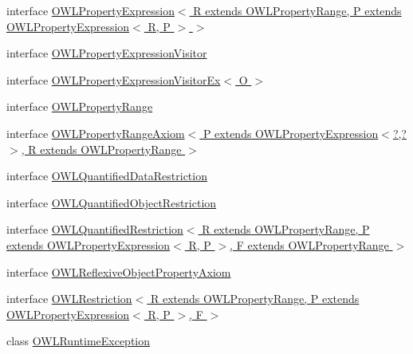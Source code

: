 \begin{DoxyCompactItemize}
\item 
interface \hyperlink{interfaceorg_1_1semanticweb_1_1owlapi_1_1model_1_1_o_w_l_property_expression_3_01_r_01extends_0189559738b26c5864733719a0227d2300}{O\-W\-L\-Property\-Expression$<$ R extends O\-W\-L\-Property\-Range, P extends O\-W\-L\-Property\-Expression$<$ R, P $>$ $>$}
\item 
interface \hyperlink{interfaceorg_1_1semanticweb_1_1owlapi_1_1model_1_1_o_w_l_property_expression_visitor}{O\-W\-L\-Property\-Expression\-Visitor}
\item 
interface \hyperlink{interfaceorg_1_1semanticweb_1_1owlapi_1_1model_1_1_o_w_l_property_expression_visitor_ex_3_01_o_01_4}{O\-W\-L\-Property\-Expression\-Visitor\-Ex$<$ O $>$}
\item 
interface \hyperlink{interfaceorg_1_1semanticweb_1_1owlapi_1_1model_1_1_o_w_l_property_range}{O\-W\-L\-Property\-Range}
\item 
interface \hyperlink{interfaceorg_1_1semanticweb_1_1owlapi_1_1model_1_1_o_w_l_property_range_axiom_3_01_p_01extends_0016041f731c436c22402051e6973b9f3}{O\-W\-L\-Property\-Range\-Axiom$<$ P extends O\-W\-L\-Property\-Expression$<$?,?$>$, R extends O\-W\-L\-Property\-Range $>$}
\item 
interface \hyperlink{interfaceorg_1_1semanticweb_1_1owlapi_1_1model_1_1_o_w_l_quantified_data_restriction}{O\-W\-L\-Quantified\-Data\-Restriction}
\item 
interface \hyperlink{interfaceorg_1_1semanticweb_1_1owlapi_1_1model_1_1_o_w_l_quantified_object_restriction}{O\-W\-L\-Quantified\-Object\-Restriction}
\item 
interface \hyperlink{interfaceorg_1_1semanticweb_1_1owlapi_1_1model_1_1_o_w_l_quantified_restriction_3_01_r_01extends6f80bc1237af3b841d9f88aecd41f7db}{O\-W\-L\-Quantified\-Restriction$<$ R extends O\-W\-L\-Property\-Range, P extends O\-W\-L\-Property\-Expression$<$ R, P $>$, F extends O\-W\-L\-Property\-Range $>$}
\item 
interface \hyperlink{interfaceorg_1_1semanticweb_1_1owlapi_1_1model_1_1_o_w_l_reflexive_object_property_axiom}{O\-W\-L\-Reflexive\-Object\-Property\-Axiom}
\item 
interface \hyperlink{interfaceorg_1_1semanticweb_1_1owlapi_1_1model_1_1_o_w_l_restriction_3_01_r_01extends_01_o_w_l_pe9e202d85055c07a1b3bb2521accae74}{O\-W\-L\-Restriction$<$ R extends O\-W\-L\-Property\-Range, P extends O\-W\-L\-Property\-Expression$<$ R, P $>$, F $>$}
\item 
class \hyperlink{classorg_1_1semanticweb_1_1owlapi_1_1model_1_1_o_w_l_runtime_exception}{O\-W\-L\-Runtime\-Exception}

\end{DoxyCompactItemize}
